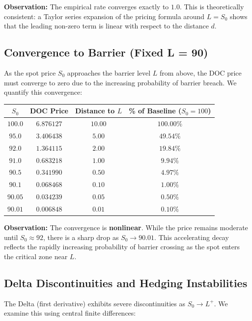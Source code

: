\documentclass{report}
\begin{document}
\textbf{Observation:} The empirical rate converges exactly to $1.0$. This is theoretically consistent: a Taylor series expansion of the pricing formula around $L=S_0$ shows that the leading non-zero term is linear with respect to the distance $d$.

\subsection{Convergence to Barrier (Fixed L = 90)}

As the spot price $S_0$ approaches the barrier level $L$ from above, the DOC price must converge to zero due to the increasing probability of barrier breach. We quantify this convergence:

\begin{center}
\begin{tabular}{cccc}
\toprule
$S_0$ & DOC Price & Distance to $L$ & \% of Baseline ($S_0=100$) \\
\midrule
$100.0$ & $6.876127$ & $10.00$ & $100.00\%$ \\
$95.0$ & $3.406438$ & $5.00$ & $49.54\%$ \\
$92.0$ & $1.364115$ & $2.00$ & $19.84\%$ \\
$91.0$ & $0.683218$ & $1.00$ & $9.94\%$ \\
$90.5$ & $0.341990$ & $0.50$ & $4.97\%$ \\
$90.1$ & $0.068468$ & $0.10$ & $1.00\%$ \\
$90.05$ & $0.034239$ & $0.05$ & $0.50\%$ \\
$90.01$ & $0.006848$ & $0.01$ & $0.10\%$ \\
\bottomrule
\end{tabular}
\end{center}

\textbf{Observation:} The convergence is \textbf{nonlinear}. While the price remains moderate until $S_0 \approx 92$, there is a sharp drop as $S_0 \to 90.01$. This accelerating decay reflects the rapidly increasing probability of barrier crossing as the spot enters the critical zone near $L$.

\subsection{Delta Discontinuities and Hedging Instabilities}

The Delta (first derivative) exhibits severe discontinuities as $S_0 \to L^+$. We examine this using central finite differences:
\end{document}
